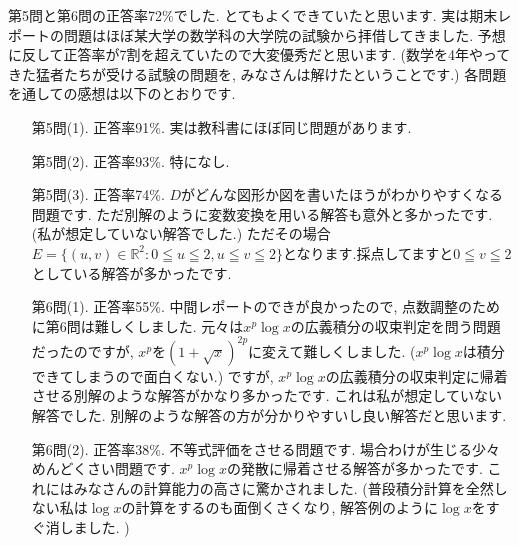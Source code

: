 \documentclass[dvipdfmx,a4paper,11pt]{article}
\newcommand{\R}{\mathbb{R}}
\theoremstyle{definition}
\begin{document}
\hspace{-11pt}{\Large 期末レポートについて}

第5問と第6問の正答率72\%でした. とてもよくできていたと思います.
実は期末レポートの問題はほぼ某大学の数学科の大学院の試験から拝借してきました.
予想に反して正答率が7割を超えていたので大変優秀だと思います.
(数学を4年やってきた猛者たちが受ける試験の問題を, みなさんは解けたということです.)
各問題を通しての感想は以下のとおりです.
\begin{itemize}
\item [第5問(1).] 正答率91\%. 実は教科書にほぼ同じ問題があります.
\item [第5問(2).] 正答率93\%. 特になし.
\item [第5問(3).] 正答率74\%. $D$がどんな図形か図を書いたほうがわかりやすくなる問題です.
 ただ別解のように変数変換を用いる解答も意外と多かったです. (私が想定していない解答でした.) ただその場合$E=\{ (u ,v) \in \R^2 : 0 \leqq u \leqq 2,  u \leqq v \leqq 2\}$となります.採点してますと$0 \leqq v \leqq 2$としている解答が多かったです. 
\item [第6問(1).] 正答率55\%. 中間レポートのできが良かったので, 点数調整のために第6問は難しくしました. 
元々は$x^p \log x$の広義積分の収束判定を問う問題だったのですが, $x^p$を$(1+\sqrt{x})^{2p}$に変えて難しくしました. ($x^p \log x$は積分できてしまうので面白くない.)
ですが, $x^p \log x$の広義積分の収束判定に帰着させる別解のような解答がかなり多かったです. 
これは私が想定していない解答でした. 別解のような解答の方が分かりやすいし良い解答だと思います.
\item [第6問(2).] 正答率38\%. 不等式評価をさせる問題です. 場合わけが生じる少々めんどくさい問題です.
$x^p \log x$の発散に帰着させる解答が多かったです.
これにはみなさんの計算能力の高さに驚かされました.
(普段積分計算を全然しない私は$\log x$の計算をするのも面倒くさくなり, 解答例のように$\log x$をすぐ消しました. )
\end{itemize}

   \vspace{33pt}
   
\end{document}
